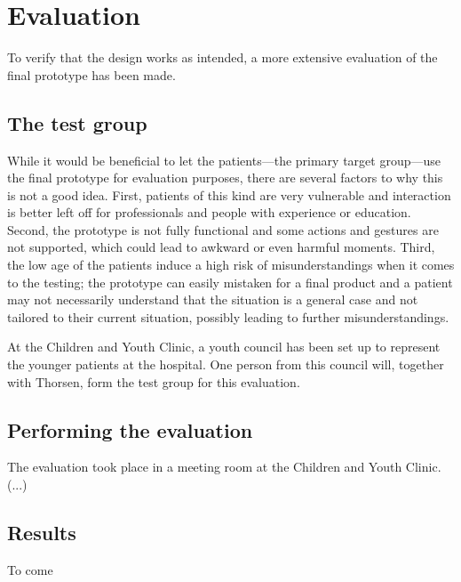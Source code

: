 \chapter{Evaluation}
\label{ch:evaluation}

To verify that the design works as intended, a more extensive evaluation of the final prototype has been made.

\section{The test group}

While it would be beneficial to let the patients---the primary target group---use the final prototype for evaluation purposes, there are several factors to why this is not a good idea. First, patients of this kind are very vulnerable and interaction is better left off for professionals and people with experience or education. Second, the prototype is not fully functional and some actions and gestures are not supported, which could lead to awkward or even harmful moments. Third, the low age of the patients induce a high risk of misunderstandings when it comes to the testing; the prototype can easily mistaken for a final product and a patient may not necessarily understand that the situation is a general case and not tailored to their current situation, possibly leading to further misunderstandings.

At the Children and Youth Clinic, a youth council has been set up to represent the younger patients at the hospital. One person from this council will, together with Thorsen, form the test group for this evaluation.



\section{Performing the evaluation}

The evaluation took place in a meeting room at the Children and Youth Clinic. (...)

\section{Results}

To come

